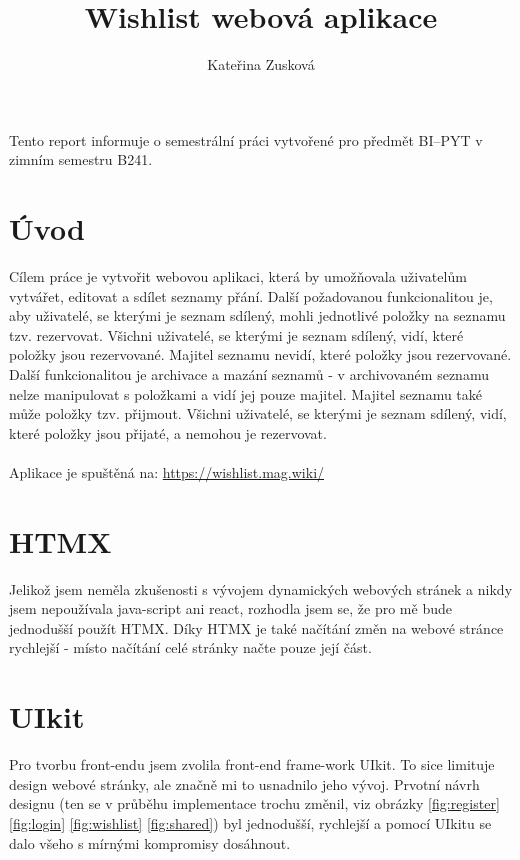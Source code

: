 \documentclass[czech]{pyt-report}
\title{Wishlist webová aplikace}
\author{Kateřina Zusková}
\affiliation{ČVUT--FIT}
\begin{document}
\maketitle

Tento report informuje o semestrální práci vytvořené
pro předmět BI–PYT v zimním semestru B241.

\section{Úvod}
Cílem práce je vytvořit webovou aplikaci, která by umožňovala uživatelům vytvářet, editovat a sdílet seznamy přání. Další požadovanou funkcionalitou je, aby uživatelé, se kterými je seznam sdílený, mohli jednotlivé položky na seznamu tzv. rezervovat. Všichni uživatelé, se kterými je seznam sdílený, vidí, které položky jsou rezervované. Majitel seznamu nevidí, které položky jsou rezervované. Další funkcionalitou je archivace a mazání seznamů - v archivovaném seznamu nelze manipulovat s položkami a vidí jej pouze majitel. Majitel seznamu také může položky tzv. přijmout. Všichni uživatelé, se kterými je seznam sdílený, vidí, které položky jsou přijaté, a nemohou je rezervovat.
\\
\\
Aplikace je spuštěná na: \url{https://wishlist.mag.wiki/}

\section{HTMX}
Jelikož jsem neměla zkušenosti s vývojem dynamických webových stránek a nikdy jsem nepoužívala java-script ani react, rozhodla jsem se, že pro mě bude jednodušší použít HTMX. Díky HTMX je také načítání změn na webové stránce rychlejší - místo načítání celé stránky načte pouze její část.

\section{UIkit}
Pro tvorbu front-endu jsem zvolila front-end frame-work UIkit. To sice limituje design webové stránky, ale značně mi to usnadnilo jeho vývoj. Prvotní návrh designu (ten se v průběhu implementace trochu změnil, viz obrázky \ref{fig:register} \ref{fig:login} \ref{fig:wishlist} \ref{fig:shared}) byl jednodušší, rychlejší a pomocí UIkitu se dalo všeho s mírnými kompromisy dosáhnout.
\end{document}
